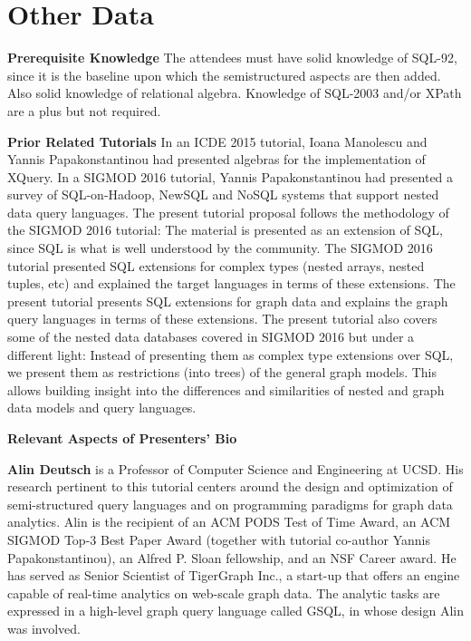 

\section{Other Data}
\label{sec:duration}

\noindent \textbf{Prerequisite Knowledge} 
\label{sec:audience}
The attendees must have solid knowledge of SQL-92, since it is the baseline upon which the semistructured aspects are then added. Also solid knowledge of relational algebra. Knowledge of SQL-2003 and/or XPath are a plus but not required.

\noindent \textbf{Prior Related Tutorials}
In an ICDE 2015 tutorial, Ioana Manolescu and Yannis Papakonstantinou had presented algebras for the implementation of XQuery. In a SIGMOD 2016 tutorial, Yannis Papakonstantinou had presented a survey of SQL-on-Hadoop, NewSQL and NoSQL systems that support nested data query languages. The present tutorial proposal follows the methodology of the SIGMOD 2016 tutorial: The material is presented as an extension of SQL, since SQL is what is well understood by the community. The SIGMOD 2016 tutorial presented SQL extensions for complex types (nested arrays, nested tuples, etc) and explained the target languages in terms of these extensions. The present tutorial presents SQL extensions for graph data and explains the graph query languages in terms of these extensions. The present tutorial also covers some of the nested data databases covered in SIGMOD 2016 but under a different light: Instead of presenting them as complex type extensions over SQL, we present them as restrictions (into trees) of the general graph models. This allows building insight into the differences and similarities of nested and graph data models and query languages.

\smallskip
\noindent \textbf{Relevant Aspects of Presenters' Bio} 

\textbf{Alin Deutsch} is a Professor of Computer Science and Engineering at UCSD. His research pertinent to this tutorial centers around the design and optimization of semi-structured query languages
and on programming paradigms for graph data analytics. Alin is the recipient of an ACM PODS Test of Time Award, an ACM SIGMOD Top-3 Best Paper Award (together with tutorial co-author Yannis Papakonstantinou), an Alfred P. Sloan fellowship, and an NSF Career award.
He has served as Senior Scientist of TigerGraph Inc., a start-up that offers an engine capable of real-time analytics on web-scale graph data.
The analytic tasks are  expressed in a high-level graph query language called GSQL, in whose design Alin was involved.

